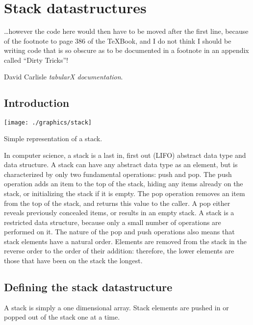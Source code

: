 
\chapter{Stack datastructures}

\hfill\hfill\parbox{9cm}{\vspace{-30pt}
\small \ldots however the code here would then have to be moved after the first line, because of the footnote to page 386 of the \TeX Book, and I do not think I should be writing code that is so obscure as to be documented in a footnote in an appendix called ``Dirty Tricks''!

\hfill\hfill David Carlisle \textit{tabularX documentation}.
}

\section{Introduction}
\begin{marginfigure}
\texttt{[image: ./graphics/stack]}
\caption{Simple representation of a stack.}
\end{marginfigure}
In computer science, a stack is a last in, first out (LIFO) abstract data type and data structure. A stack can have any abstract data type as an element, but is characterized by only two fundamental operations: push and pop. The push operation adds an item to the top of the stack, hiding any items already on the stack, or initializing the stack if it is empty. The pop operation removes an item from the top of the stack, and returns this value to the caller. A pop either reveals previously concealed items, or results in an empty stack.
A stack is a restricted data structure, because only a small number of operations are performed on it. The nature of the pop and push operations also means that stack elements have a natural order. Elements are removed from the stack in the reverse order to the order of their addition: therefore, the lower elements are those that have been on the stack the longest.


\makeatletter
\section{Defining the stack datastructure}
\parindent0pt
A stack is simply a one dimensional array. Stack elements are pushed in or popped out of the stack one at a time.

